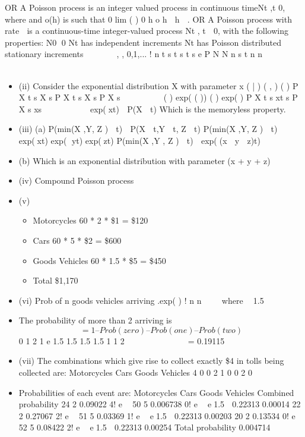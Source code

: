 \documentclass[a4paper,12pt]{article}
\begin{document}
OR
A Poisson process is an integer valued process in continuous time{Nt ,t 0},
where
and o(h) is such that
0
lim ( ) 0
h
o h
 h
 .
OR
A Poisson process with rate  is a continuous-time integer-valued process
Nt , t  0, with the following properties:
  N0 0
Nt has independent increments
Nt has Poisson distributed stationary increments
     
, , 0,1,...
!
  n t s
t s
t s e
P N N n s t n
n
            

\begin{itemize}
    \item 
(ii) Consider the exponential distribution X with parameter x
( | ) ( , )
( )
P X t s X s P X t s X s
P X s
  
   

( ) exp( ( ))
( ) exp( )
P X t s xt s
P X s xs
   
 
 
 exp(xt)  P(X  t)
Which is the memoryless property. 
\item (iii) (a) P(min(X ,Y, Z )  t)  P(X  t,Y  t, Z  t)
P(min(X ,Y, Z )  t)  exp(xt) exp( yt) exp(zt)
P(min(X ,Y , Z )  t)  exp((x  y  z)t)
\item (b) Which is an exponential distribution with parameter (x + y + z) 
\item (iv) Compound Poisson process 
\item (v)
\begin{itemize}
    \item  Motorcycles 60 * 2 * \$1 = \$120
    \item Cars 60 * 5 * \$2 = \$600
\item Goods Vehicles 60 * 1.5 * \$5 = \$450
\item Total \$1,170 
\end{itemize}

\item (vi) Prob of n goods vehicles arriving
.exp( )
!
  n
n
 
 where  1.5
\item The probability of more than 2 arriving is
\[ = 1 – Prob (zero) – Prob (one) – Prob (two)\]
0 1 2
1 e 1.5 1.5 1.5 1.5
1 1 2
  
     
 
= 0.19115 
\item (vii) The combinations which give rise to collect exactly \$4 in tolls being collected
are:
  Motorcycles
Cars Goods Vehicles
4 0 0
2 1 0
0 2 0
\item Probabilities of each event are:
  Motorcycles Cars Goods Vehicles Combined
probability
24 2 0.09022
4!
  e

50 5 0.006738
0!
  e
 e1.5  0.22313 0.00014
22 2 0.27067
2!
  e

51 5 0.03369
1!
  e
 e1.5  0.22313 0.00203
20 2 0.13534
0!
  e

52 5 0.08422
2!
  e
 e1.5  0.22313 0.00254
Total probability 0.004714 
\end{itemize}
\end{document}

